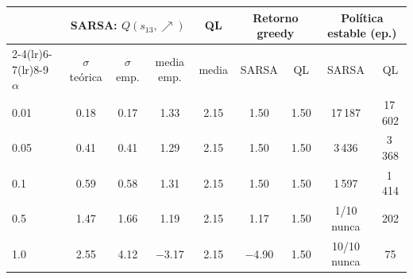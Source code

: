 \begin{tabular}{lcccccccc}
\toprule
 & \multicolumn{3}{c}{SARSA: $Q(s_{13},\nearrow)$} & QL & \multicolumn{2}{c}{Retorno greedy} & \multicolumn{2}{c}{Política estable (ep.)} \\
\cmidrule(lr){2-4}\cmidrule(lr){6-7}\cmidrule(lr){8-9}
$\alpha$ & $\sigma$ teórica & $\sigma$ emp. & media emp. & media & SARSA & QL & SARSA & QL \\
\midrule
0.01 & 0.18 & 0.17 & 1.33 & 2.15 & 1.50 & 1.50 & 17\,187 & 17\,602 \\
0.05 & 0.41 & 0.41 & 1.29 & 2.15 & 1.50 & 1.50 & 3\,436 & 3\,368 \\
0.1 & 0.59 & 0.58 & 1.31 & 2.15 & 1.50 & 1.50 & 1\,597 & 1\,414 \\
0.5 & 1.47 & 1.66 & 1.19 & 2.15 & 1.17 & 1.50 & 1/10 nunca & 202 \\
1.0 & 2.55 & 4.12 & $-$3.17 & 2.15 & $-$4.90 & 1.50 & 10/10 nunca & 75 \\
\bottomrule
\end{tabular}
